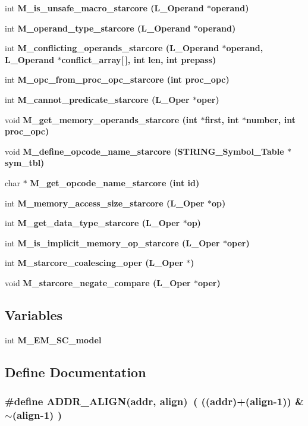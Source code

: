 \begin{CompactItemize}
int \bf{M\_\-is\_\-unsafe\_\-macro\_\-starcore} (L\_\-Operand $\ast$operand)
\item 
int \bf{M\_\-operand\_\-type\_\-starcore} (L\_\-Operand $\ast$operand)
\item 
int \bf{M\_\-conflicting\_\-operands\_\-starcore} (L\_\-Operand $\ast$operand, L\_\-Operand $\ast$conflict\_\-array[$\,$], int len, int prepass)
\item 
int \bf{M\_\-opc\_\-from\_\-proc\_\-opc\_\-starcore} (int proc\_\-opc)
\item 
int \bf{M\_\-cannot\_\-predicate\_\-starcore} (L\_\-Oper $\ast$oper)
\item 
void \bf{M\_\-get\_\-memory\_\-operands\_\-starcore} (int $\ast$first, int $\ast$number, int proc\_\-opc)
\item 
void \bf{M\_\-define\_\-opcode\_\-name\_\-starcore} (\bf{STRING\_\-Symbol\_\-Table} $\ast$sym\_\-tbl)
\item 
char $\ast$ \bf{M\_\-get\_\-opcode\_\-name\_\-starcore} (int id)
\item 
int \bf{M\_\-memory\_\-access\_\-size\_\-starcore} (L\_\-Oper $\ast$op)
\item 
int \bf{M\_\-get\_\-data\_\-type\_\-starcore} (L\_\-Oper $\ast$op)
\item 
int \bf{M\_\-is\_\-implicit\_\-memory\_\-op\_\-starcore} (L\_\-Oper $\ast$oper)
\item 
int \bf{M\_\-starcore\_\-coalescing\_\-oper} (L\_\-Oper $\ast$)
\item 
void \bf{M\_\-starcore\_\-negate\_\-compare} (L\_\-Oper $\ast$oper)
\end{CompactItemize}
\subsection*{Variables}
\begin{CompactItemize}
\item 
int \bf{M\_\-EM\_\-SC\_\-model}
\end{CompactItemize}


\subsection{Define Documentation}
\subsubsection{\setlength{\rightskip}{0pt plus 5cm}\#define ADDR\_\-ALIGN(addr, align)~( ((addr)+(align-1)) \& $\sim$(align-1) )}\label{m__starcore_8h_6d086102bb3c719ca1cff92d03dccb3a}





